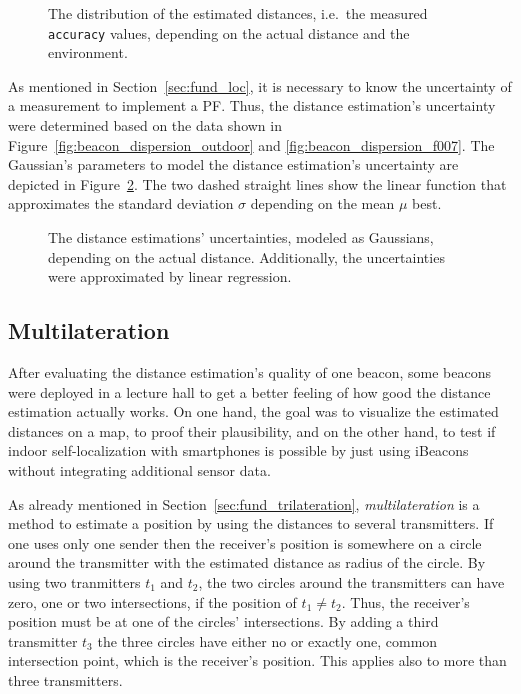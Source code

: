 \begin{figure}
	
	\caption{The distribution of the estimated distances, i.e.\ the measured \texttt{accuracy} values, depending on the actual distance and the environment.}
	\label{fig:beacon_dispersion}
\end{figure}

As mentioned in Section~\ref{sec:fund_loc}, it is necessary to know the uncertainty of a measurement to implement a \acl{PF}. Thus, the distance estimation's uncertainty were determined based on the data shown in Figure~\ref{fig:beacon_dispersion_outdoor} and \ref{fig:beacon_dispersion_f007}. The Gaussian's parameters to model the distance estimation's uncertainty are depicted in Figure~\ref{fig:beacon_eval_ndf}. The two dashed straight lines show the linear function that approximates the standard deviation $\sigma$ depending on the mean $\mu$ best.

\begin{figure}
	
	\caption{The distance estimations' uncertainties, modeled as Gaussians, depending on the actual distance. Additionally, the uncertainties were approximated by linear regression.}
	\label{fig:beacon_eval_ndf}
\end{figure}


\subsection{Multilateration}
After evaluating the distance estimation's quality of one beacon, some beacons were deployed in a lecture hall to get a better feeling of how good the distance estimation actually works. On one hand, the goal was to visualize the estimated distances on a map, to proof their plausibility, and on the other hand, to test if indoor self-localization with smartphones is possible by just using iBeacons without integrating additional sensor data.

As already mentioned in Section~\ref{sec:fund_trilateration}, \emph{multilateration} is a method to estimate a position by using the distances to several transmitters. If one uses only one sender then the receiver's position is somewhere on a circle around the transmitter with the estimated distance as radius of the circle.
By using two tranmitters $t_1$ and $t_2$, the two circles around the transmitters can have zero, one or two intersections, if the position of $t_1 \neq t_2$. Thus, the receiver's position must be at one of the circles' intersections.
By adding a third transmitter $t_3$ the three circles have either no or exactly one, common intersection point, which is the receiver's position. This applies also to more than three transmitters.

